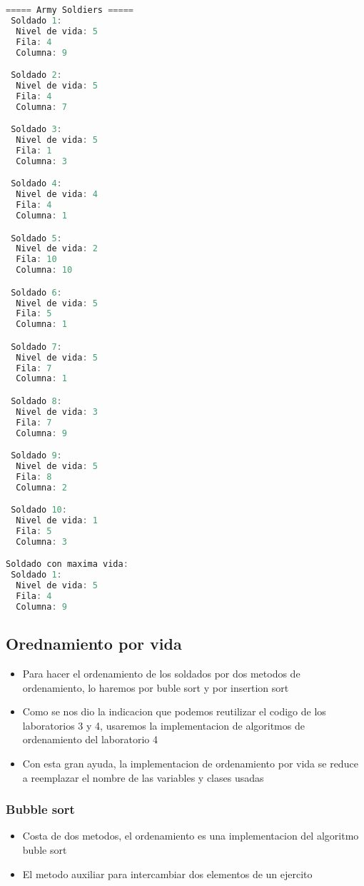         \begin{lstlisting}[language=java, caption={Consola}]
===== Army Soldiers =====
 Soldado 1:
  Nivel de vida: 5
  Fila: 4
  Columna: 9

 Soldado 2:
  Nivel de vida: 5
  Fila: 4
  Columna: 7

 Soldado 3:
  Nivel de vida: 5
  Fila: 1
  Columna: 3

 Soldado 4:
  Nivel de vida: 4
  Fila: 4
  Columna: 1

 Soldado 5:
  Nivel de vida: 2
  Fila: 10
  Columna: 10

 Soldado 6:
  Nivel de vida: 5
  Fila: 5
  Columna: 1

 Soldado 7:
  Nivel de vida: 5
  Fila: 7
  Columna: 1

 Soldado 8:
  Nivel de vida: 3
  Fila: 7
  Columna: 9

 Soldado 9:
  Nivel de vida: 5
  Fila: 8
  Columna: 2

 Soldado 10:
  Nivel de vida: 1
  Fila: 5
  Columna: 3

Soldado con maxima vida:
 Soldado 1:
  Nivel de vida: 5
  Fila: 4
  Columna: 9
\end{lstlisting}

\subsection{Orednamiento por vida}
\begin{itemize}
    \item Para hacer el ordenamiento de los soldados por dos metodos de ordenamiento, lo haremos por buble sort y por insertion sort
    \item Como se nos dio la indicacion que podemos reutilizar el codigo de los laboratorios 3 y 4, usaremos la implementacion de algoritmos de ordenamiento del laboratorio 4
    \item Con esta gran ayuda, la  implementacion de ordenamiento por vida se reduce a reemplazar el nombre de las variables y clases usadas
\end{itemize}
\subsubsection{Bubble sort}
\begin{itemize}
    \item Costa de dos metodos, el ordenamiento es una implementacion del algoritmo buble sort
    \item El metodo auxiliar para intercambiar dos elementos de un ejercito
\end{itemize}


